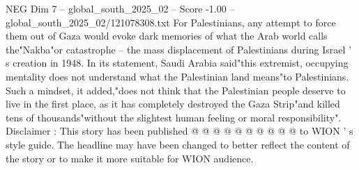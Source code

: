 \begin{textsample}{NEG Dim 7 – global\_south\_2025\_02 – Score -1.00 – global\_south\_2025\_02/121078308.txt}
For Palestinians, any attempt to force them out of Gaza would evoke dark memories of what the Arab world calls the"Nakba"or catastrophe -- the mass displacement of Palestinians during Israel ' s creation in 1948.
In its statement, Saudi Arabia said"this extremist, occupying mentality does not understand what the Palestinian land means"to Palestinians.
Such a mindset, it added,"does not think that the Palestinian people deserve to live in the first place, as it has completely destroyed the Gaza Strip"and killed tens of thousands"without the slightest human feeling or moral responsibility".
Disclaimer : This story has been published @ @ @ @ @ @ @ @ @ @ to WION ' s style guide.
The headline may have been changed to better reflect the content of the story or to make it more suitable for WION audience.

\end{textsample}
